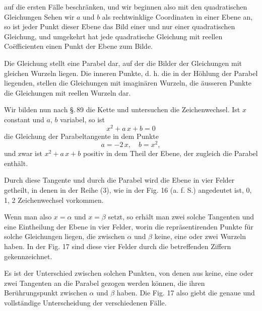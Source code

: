 auf die ersten Fälle beschränken, und wir beginnen also mit den quadratischen Gleichungen
Sehen wir $a$ und $b$ als rechtwinklige Coordinaten in einer Ebene an, so ist jeder Punkt dieser Ebene das Bild einer und nur einer quadratischen Gleichung, und umgekehrt hat jede quadratische Gleichung mit reellen Co\"efficienten einen Punkt der Ebene zum Bilde.

Die Gleichung
stellt eine Parabel dar, auf der die Bilder der Gleichungen mit gleichen Wurzeln liegen. Die inneren Punkte, d. h. die in der H\"ohlung der Parabel liegenden, stellen die Gleichungen mit imaginären Wurzeln, die äusseren Punkte die Gleichungen mit reellen Wurzeln dar.

Wir bilden nun nach \S.\,89 die  Kette
und untersuchen die Zeichenwechsel. Ist $x$ constant und $a$, $b$ variabel, so ist
\[
x^2 + a\,x + b = 0
\]
die Gleichung der Parabeltangente in dem Punkte
\[
a = -2\,x,\quad b = x^2,
\]
und zwar ist $x^2 + a\,x + b$ positiv in dem Theil der Ebene, der zugleich die Parabel enthält.

Durch diese Tangente und durch die Parabel wird die Ebene in vier Felder getheilt, in denen in der Reihe (3), wie in der Fig. 16 (a. f. S.) angedeutet ist, 0, 1, 2 Zeichenwechsel vorkommen.

Wenn man also $x = \alpha$ und $x = \beta$ setzt, so erhält man zwei solche Tangenten und eine Eintheilung der Ebene in vier Felder, worin die repräsentirenden Punkte für solche Gleichungen liegen, die zwischen $\alpha$ und $\beta$ keine, eine oder zwei Wurzeln haben. In der Fig. 17 sind diese vier Felder durch die betreffenden Ziffern gekennzeichnet.

Es ist der Unterschied zwischen solchen Punkten, von denen aus keine, eine oder zwei Tangenten an die Parabel gezogen werden können, die ihren Berührungspunkt zwischen $\alpha$ und $\beta$ haben. Die Fig. 17 also giebt die genaue und vollständige Unterscheidung der verschiedenen Fälle.
